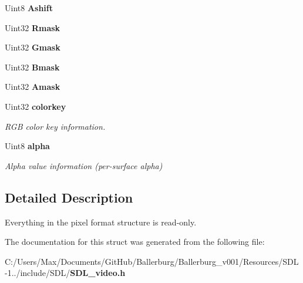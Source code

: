 \begin{DoxyCompactItemize}
\item 
Uint8 {\bfseries Ashift}\label{struct_s_d_l___pixel_format_ac3c4ffa0de1f2c94040340deede3bf46}

\item 
Uint32 {\bfseries Rmask}\label{struct_s_d_l___pixel_format_a35e5793f6e9c356aec2d130167174946}

\item 
Uint32 {\bfseries Gmask}\label{struct_s_d_l___pixel_format_a3d07a81b430202c6ea0089d8df8f4e15}

\item 
Uint32 {\bfseries Bmask}\label{struct_s_d_l___pixel_format_ad366812df3ae62edb9ae6cb89234fddb}

\item 
Uint32 {\bfseries Amask}\label{struct_s_d_l___pixel_format_a6cdaf31f6cb153fefda47fa6b8368c0e}

\item 
Uint32 {\bf colorkey}\label{struct_s_d_l___pixel_format_a1413d87ed860296a49f8b2d8fd8ad778}

\begin{DoxyCompactList}\small\item\em R\+G\+B color key information. \end{DoxyCompactList}\item 
Uint8 {\bf alpha}\label{struct_s_d_l___pixel_format_a0b0fd9deaec730811212ecdeaa24c7ea}

\begin{DoxyCompactList}\small\item\em Alpha value information (per-\/surface alpha) \end{DoxyCompactList}\end{DoxyCompactItemize}


\subsection{Detailed Description}
Everything in the pixel format structure is read-\/only. 

The documentation for this struct was generated from the following file\+:\begin{DoxyCompactItemize}
\item 
C\+:/\+Users/\+Max/\+Documents/\+Git\+Hub/\+Ballerburg/\+Ballerburg\+\_\+v001/\+Resources/\+S\+D\+L-\/1../include/\+S\+D\+L/{\bf S\+D\+L\+\_\+video.\+h}\end{DoxyCompactItemize}
